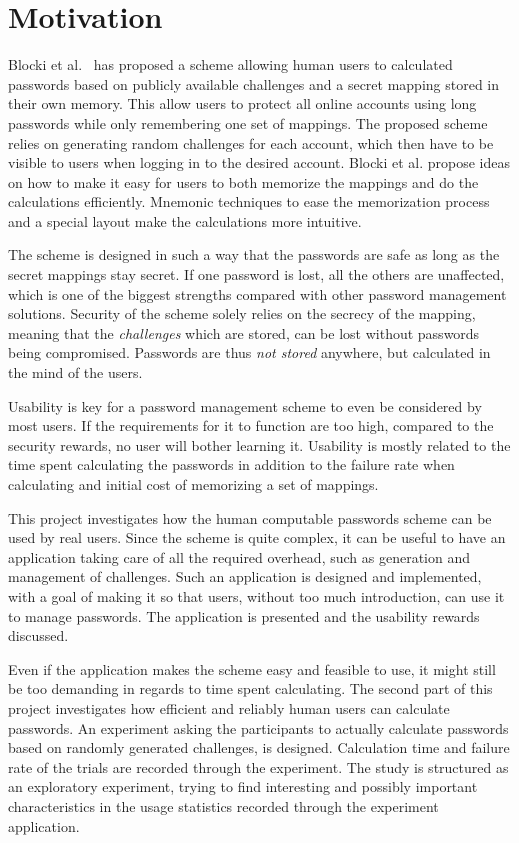 \section{Motivation}
Blocki et al.~\cite{Blocki2014,hcp-blocki} has proposed a scheme allowing human users to calculated passwords based on publicly available challenges and a secret mapping stored in their own memory. This allow users to protect all online accounts using long passwords while only remembering one set of mappings. The proposed scheme relies on generating random challenges for each account, which then have to be visible to users when logging in to the desired account. Blocki et al. propose ideas on how to make it easy for users to both memorize the mappings and do the calculations efficiently. Mnemonic techniques to ease the memorization process and a special layout make the calculations more intuitive.
\par The scheme is designed in such a way that the passwords are safe as long as the secret mappings stay secret. If one password is lost, all the others are unaffected, which is one of the biggest strengths compared with other password management solutions. Security of the scheme solely relies on the secrecy of the mapping, meaning that the \emph{challenges} which are stored, can be lost without passwords being compromised. Passwords are thus \emph{not stored} anywhere, but calculated in the mind of the users. 
\par Usability is key for a password management scheme to even be considered by most users. If the requirements for it to function are too high, compared to the security rewards, no user will bother learning it. Usability is mostly related to the time spent calculating the passwords in addition to the failure rate when calculating and initial cost of memorizing a set of mappings.
\par This project investigates how the human computable passwords scheme can be used by real users. Since the scheme is quite complex, it can be useful to have an application taking care of all the required overhead, such as generation and management of challenges. Such an application is designed and implemented, with a goal of making it so that users, without too much introduction, can use it to manage passwords. The application is presented and the usability rewards discussed.
\par Even if the application makes the scheme easy and feasible to use, it might still be too demanding in regards to time spent calculating. The second part of this project investigates how efficient and reliably human users can calculate passwords. An experiment asking the participants to actually calculate passwords based on randomly generated challenges, is designed. Calculation time and failure rate of the trials are recorded through the experiment. The study is structured as an exploratory experiment, trying to find interesting and possibly important characteristics in the usage statistics recorded through the experiment application.

